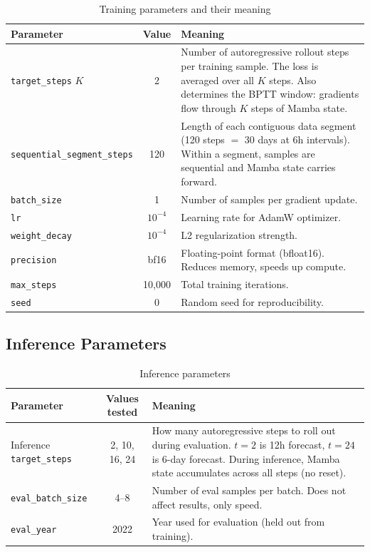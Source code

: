 \documentclass[11pt,a4paper]{article}
\begin{document}
\begin{table}[H]
\centering
\caption{Training parameters and their meaning}
\begin{tabular}{p{4cm}cp{6.5cm}}
\toprule
Parameter & Value & Meaning \\
\midrule
\texttt{target\_steps} $K$ & 2 & Number of autoregressive rollout steps per training sample. The loss is averaged over all $K$ steps. Also determines the BPTT window: gradients flow through $K$ steps of Mamba state. \\
\texttt{sequential\_segment\_steps} & 120 & Length of each contiguous data segment (120 steps $=$ 30 days at 6h intervals). Within a segment, samples are sequential and Mamba state carries forward. \\
\texttt{batch\_size} & 1 & Number of samples per gradient update. \\
\texttt{lr} & $10^{-4}$ & Learning rate for AdamW optimizer. \\
\texttt{weight\_decay} & $10^{-4}$ & L2 regularization strength. \\
\texttt{precision} & bf16 & Floating-point format (bfloat16). Reduces memory, speeds up compute. \\
\texttt{max\_steps} & 10,000 & Total training iterations. \\
\texttt{seed} & 0 & Random seed for reproducibility. \\
\bottomrule
\end{tabular}
\end{table}

\subsection{Inference Parameters}

\begin{table}[H]
\centering
\caption{Inference parameters}
\begin{tabular}{p{3.5cm}cp{7cm}}
\toprule
Parameter & Values tested & Meaning \\
\midrule
Inference \texttt{target\_steps} & 2, 10, 16, 24 & How many autoregressive steps to roll out during evaluation. $t{=}2$ is 12h forecast, $t{=}24$ is 6-day forecast. During inference, Mamba state accumulates across all steps (no reset). \\
\texttt{eval\_batch\_size} & 4--8 & Number of eval samples per batch. Does not affect results, only speed. \\
\texttt{eval\_year} & 2022 & Year used for evaluation (held out from training). \\
\bottomrule
\end{tabular}
\end{table}
\end{document}
